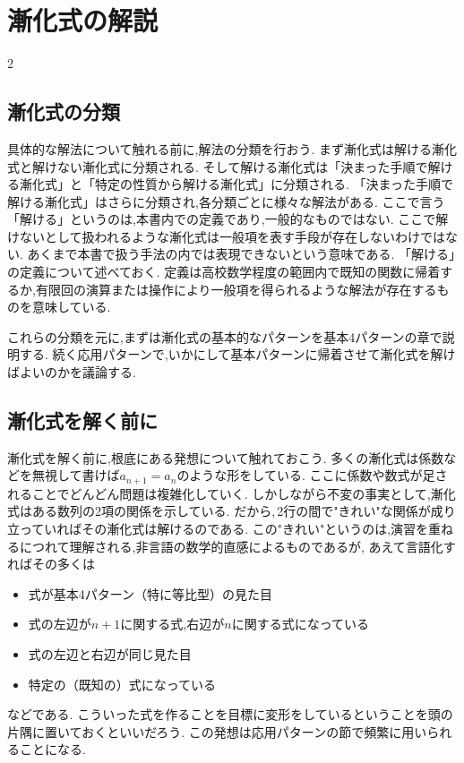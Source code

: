 \documentclass[dvipdfmx,a4paper,11pt,fleqn,openany]{jsbook}
\begin{document}
\chapter{漸化式の解説}
\begin{multicols*}{2}
  \section{漸化式の分類}
    具体的な解法について触れる前に,解法の分類を行おう.
    まず漸化式は解ける漸化式と解けない漸化式に分類される.
    そして解ける漸化式は「決まった手順で解ける漸化式」と「特定の性質から解ける漸化式」に分類される.
    「決まった手順で解ける漸化式」はさらに分類され,各分類ごとに様々な解法がある.
    ここで言う「解ける」というのは,本書内での定義であり,一般的なものではない.
    ここで解けないとして扱われるような漸化式は一般項を表す手段が存在しないわけではない.
    あくまで本書で扱う手法の内では表現できないという意味である.
    「解ける」の定義について述べておく.
    定義は高校数学程度の範囲内で既知の関数に帰着するか,有限回の演算または操作により一般項を得られるような解法が存在するものを意味している.

    これらの分類を元に,まずは漸化式の基本的なパターンを基本4パターンの章で説明する.
    続く応用パターンで,いかにして基本パターンに帰着させて漸化式を解けばよいのかを議論する.

  \section{漸化式を解く前に}\label{sec:before}
    漸化式を解く前に,根底にある発想について触れておこう.
    多くの漸化式は係数などを無視して書けば$a_{n+1}=a_n$のような形をしている.
    ここに係数や数式が足されることでどんどん問題は複雑化していく.
    しかしながら不変の事実として,漸化式はある数列の2項の関係を示している.
    だから,\,2行の間で"きれい"な関係が成り立っていればその漸化式は解けるのである.
    この"きれい"というのは,演習を重ねるにつれて理解される,非言語の数学的直感によるものであるが,
    あえて言語化すればその多くは
    \begin{itemize}
      \item 式が基本4パターン（特に等比型）の見た目
      \item 式の左辺が$n+1$に関する式,右辺が$n$に関する式になっている
      \item 式の左辺と右辺が同じ見た目
      \item 特定の（既知の）式になっている
    \end{itemize}
    などである.
    こういった式を作ることを目標に変形をしているということを頭の片隅に置いておくといいだろう.
    この発想は応用パターンの節で頻繁に用いられることになる.


\end{multicols*}
\end{document}
